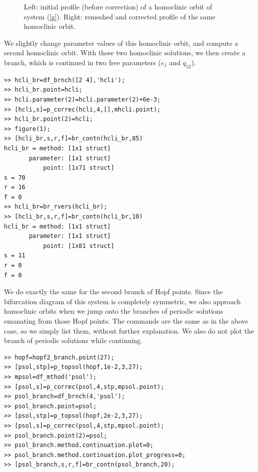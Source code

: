 \documentclass[10pt]{article}
\begin{document}
{\begin{figure}[ht]
\begin{center}
\caption{\small Left: initial profile (before correction) of a homoclinic orbit of 
system (\ref{z}). Right: remeshed and corrected profile of the same homoclinic 
orbit. \label{demo3-4+5}} 
\end{center}
\end{figure}

We slightly change parameter values of this homoclinic orbit, and compute
a second homoclinic orbit.  With these two homoclinic solutions, 
we then
create a branch, which is continued in two free parameters ($e_1$ 
and $q_{12}$).

{\small\begin{verbatim}
>> hcli_br=df_brnch([2 4],'hcli');
>> hcli_br.point=hcli;
>> hcli.parameter(2)=hcli.parameter(2)+6e-3;
>> [hcli,s]=p_correc(hcli,4,[],mhcli.point);
>> hcli_br.point(2)=hcli;
>> figure(1);
>> [hcli_br,s,r,f]=br_contn(hcli_br,85)
hcli_br = method: [1x1 struct]
       parameter: [1x1 struct]
           point: [1x71 struct]
s = 70
r = 16
f = 0
>> hcli_br=br_rvers(hcli_br);
>> [hcli_br,s,r,f]=br_contn(hcli_br,10)
hcli_br = method: [1x1 struct]
       parameter: [1x1 struct]
           point: [1x81 struct]
s = 11
r = 0
f = 0 
\end{verbatim}}
We do exactly the same for the second branch of Hopf points.  Since 
the bifurcation diagram of this system is completely symmetric, 
we also approach 
homoclinic orbits when we jump onto the branches of periodic solutions 
emanating
from those Hopf points.  The commands are the same as in the above case,
so we simply list them, without further explanation.  We also do not
plot the branch of periodic solutions while continuing.
{\small\begin{verbatim}
>> hopf=hopf2_branch.point(27);
>> [psol,stp]=p_topsol(hopf,1e-2,3,27);
>> mpsol=df_mthod('psol');
>> [psol,s]=p_correc(psol,4,stp,mpsol.point);
>> psol_branch=df_brnch(4,'psol');
>> psol_branch.point=psol;
>> [psol,stp]=p_topsol(hopf,2e-2,3,27);
>> [psol,s]=p_correc(psol,4,stp,mpsol.point);
>> psol_branch.point(2)=psol;
>> psol_branch.method.continuation.plot=0;
>> psol_branch.method.continuation.plot_progress=0;
>> [psol_branch,s,r,f]=br_contn(psol_branch,20);


\end{verbatim}}}
\end{document}
